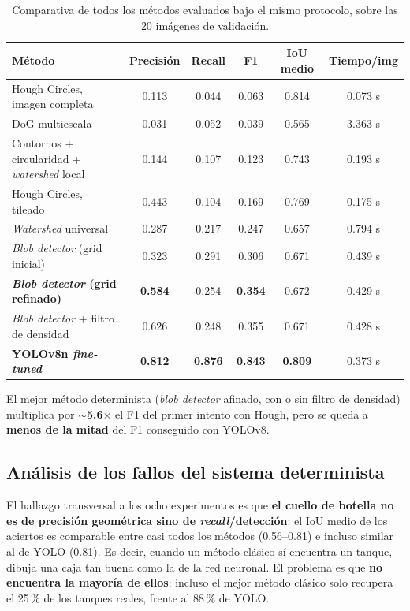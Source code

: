 \documentclass[11pt,a4paper]{article}
\begin{document}
\begin{table}[h!]
\centering
\small
\begin{tabular}{@{}lccccc@{}}
\toprule
\textbf{Método} & \textbf{Precisión} & \textbf{Recall} & \textbf{F1} & \textbf{IoU medio} & \textbf{Tiempo/img} \\
\midrule
Hough Circles, imagen completa & 0.113 & 0.044 & 0.063 & 0.814 & 0.073 s \\
DoG multiescala & 0.031 & 0.052 & 0.039 & 0.565 & 3.363 s \\
Contornos + circularidad + \emph{watershed} local & 0.144 & 0.107 & 0.123 & 0.743 & 0.193 s \\
Hough Circles, tileado & 0.443 & 0.104 & 0.169 & 0.769 & 0.175 s \\
\emph{Watershed} universal & 0.287 & 0.217 & 0.247 & 0.657 & 0.794 s \\
\emph{Blob detector} (grid inicial) & 0.323 & 0.291 & 0.306 & 0.671 & 0.439 s \\
\textbf{\emph{Blob detector} (grid refinado)} & \textbf{0.584} & 0.254 & \textbf{0.354} & 0.672 & 0.429 s \\
\emph{Blob detector} + filtro de densidad & 0.626 & 0.248 & 0.355 & 0.671 & 0.428 s \\
\textbf{YOLOv8n \emph{fine-tuned}} & \textbf{0.812} & \textbf{0.876} & \textbf{0.843} & \textbf{0.809} & 0.373 s \\
\bottomrule
\end{tabular}
\caption{Comparativa de todos los métodos evaluados bajo el mismo protocolo, sobre las 20 imágenes de validación.}
\label{tab:resultados}
\end{table}

El mejor método determinista (\emph{blob detector} afinado, con o sin filtro de
densidad) multiplica por \textbf{$\sim$5.6$\times$} el F1 del primer intento con
Hough, pero se queda a \textbf{menos de la mitad} del F1 conseguido con YOLOv8.

\subsection{Análisis de los fallos del sistema determinista}

El hallazgo transversal a los ocho experimentos es que \textbf{el cuello de botella
no es de precisión geométrica sino de \emph{recall}/detección}: el IoU medio de los
aciertos es comparable entre casi todos los métodos (0.56--0.81) e incluso similar al
de YOLO (0.81). Es decir, cuando un método clásico sí encuentra un tanque, dibuja una
caja tan buena como la de la red neuronal. El problema es que \textbf{no encuentra la
mayoría de ellos}: incluso el mejor método clásico solo recupera el 25\,\% de los
tanques reales, frente al 88\,\% de YOLO.
\end{document}
